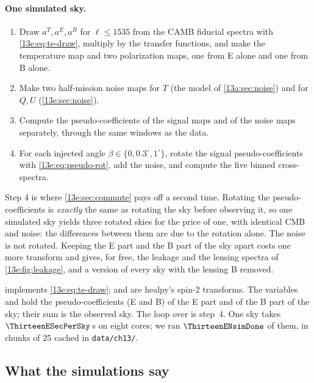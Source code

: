 \paragraph{One simulated sky.}
\begin{enumerate}[itemsep=1pt,leftmargin=1.4em]
  \item Draw $a^T,a^E,a^B$ for $\ell\le1535$ from the CAMB fiducial spectra \cite{CAMB2000} with
        \eqref{13e:eq:te-draw}, multiply by the transfer functions, and make the temperature map and two
        polarization maps, one from E alone and one from B alone.
  \item Make two half-mission noise maps for $T$ (the model of \cref{13a:sec:noise}) and for $Q,U$
        (\cref{13e:sec:noise}).
  \item Compute the pseudo-coefficients of the signal maps and of the noise maps separately, through the
        same windows as the data.
  \item For each injected angle $\beta\in\{0,0.3^\circ,1^\circ\}$, rotate the signal pseudo-coefficients with
        \eqref{13e:eq:pseudo-rot}, add the noise, and compute the five binned cross-spectra.
\end{enumerate}
Step 4 is where \cref{13e:sec:commute} pays off a second time. Rotating the pseudo-coefficients is
\emph{exactly} the same as rotating the sky before observing it, so one simulated sky yields three rotated
skies for the price of one, with identical CMB and noise: the differences between them are due to the
rotation alone. The noise is not rotated. Keeping the E part and the B part of the sky apart costs one more
transform and gives, for free, the leakage and the lensing spectra of \cref{13e:fig:leakage}, and a version of
every sky with the lensing B removed.


\noindent {} implements \eqref{13e:eq:te-draw};  and
 are healpy's spin-2 transforms. The variables  and  hold the
pseudo-coefficients (E and B) of the E part and of the B part of the sky; their sum is the observed sky. The
loop over  is step~4. One sky takes $\ThirteenESecPerSky$\,s on eight cores; we ran
$\ThirteenENsimDone$ of them, in chunks of $25$ cached in \texttt{data/ch13/}.

\subsection{What the simulations say}
\label{13e:sec:tests}

